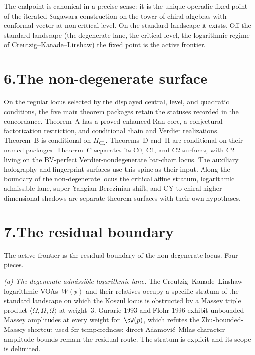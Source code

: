 The endpoint is canonical in a precise sense: it is the unique
operadic fixed point of the iterated Sugawara construction on the
tower of chiral algebras with conformal vector at non-critical
level. On the standard landscape it exists. Off the standard
landscape (the degenerate lane, the critical level, the logarithmic
regime of Creutzig--Kanade--Linshaw) the fixed point is the active
frontier.

\section*{6.\quad The non-degenerate surface}

\noindent
On the regular locus selected by the displayed central, level, and
quadratic conditions, the five main theorem packages retain the
statuses recorded in the concordance.  Theorem~A has a proved enhanced
Ran core, a conjectural factorization restriction, and conditional
chain and Verdier realizations.  Theorem~B is conditional on
$H_{\mathrm{CL}}$.  Theorems~D and~H are conditional on their named
packages.  Theorem~C separates its C0, C1, and C2 surfaces, with C2
living on the BV-perfect Verdier-nondegenerate bar-chart locus.
The auxiliary holography and fingerprint surfaces use this spine as
their input. Along the boundary of the non-degenerate locus the critical affine
stratum, logarithmic admissible lane, super-Yangian Berezinian shift,
and CY-to-chiral higher-dimensional shadows are separate theorem
surfaces with their own hypotheses.

\section*{7.\quad The residual boundary}

\noindent
The active frontier is the residual boundary of the non-degenerate
locus. Four pieces.

\medskip

\noindent\emph{(a) The degenerate admissible logarithmic
lane.}\enspace
The Creutzig--Kanade--Linshaw logarithmic VOAs~$W(p)$ and their
relatives occupy a specific stratum of the standard landscape on
which the Koszul locus is obstructed by a Massey triple product
$\langle\Omega,\Omega,\Omega\rangle$ at weight~$3$. Gurarie 1993 and
Flohr 1996 exhibit unbounded Massey amplitudes at every weight
for~$\cW(p)$, which refutes the Zhu-bounded-Massey shortcut used
for temperedness; direct Adamovi\'c--Milas character-amplitude bounds
remain the residual route. The stratum is explicit and its scope is
delimited.

